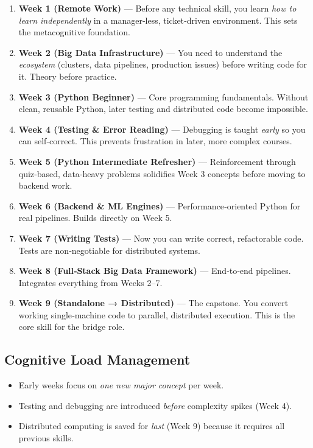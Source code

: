\documentclass[12pt]{article}
\begin{document}
	\begin{enumerate}
		\item \textbf{Week 1 (Remote Work)} — Before any technical skill, you learn \emph{how to learn independently} in a manager‑less, ticket‑driven environment. This sets the metacognitive foundation.
		
		\item \textbf{Week 2 (Big Data Infrastructure)} — You need to understand the \emph{ecosystem} (clusters, data pipelines, production issues) before writing code for it. Theory before practice.
		
		\item \textbf{Week 3 (Python Beginner)} — Core programming fundamentals. Without clean, reusable Python, later testing and distributed code become impossible.
		
		\item \textbf{Week 4 (Testing \& Error Reading)} — Debugging is taught \emph{early} so you can self‑correct. This prevents frustration in later, more complex courses.
		
		\item \textbf{Week 5 (Python Intermediate Refresher)} — Reinforcement through quiz‑based, data‑heavy problems solidifies Week 3 concepts before moving to backend work.
		
		\item \textbf{Week 6 (Backend \& ML Engines)} — Performance‑oriented Python for real pipelines. Builds directly on Week 5.
		
		\item \textbf{Week 7 (Writing Tests)} — Now you can write correct, refactorable code. Tests are non‑negotiable for distributed systems.
		
		\item \textbf{Week 8 (Full‑Stack Big Data Framework)} — End‑to‑end pipelines. Integrates everything from Weeks 2–7.
		
		\item \textbf{Week 9 (Standalone → Distributed)} — The capstone. You convert working single‑machine code to parallel, distributed execution. This is the core skill for the bridge role.
	\end{enumerate}
	
	\subsection*{Cognitive Load Management}
	\begin{itemize}
		\item Early weeks focus on \emph{one new major concept} per week.
		\item Testing and debugging are introduced \emph{before} complexity spikes (Week 4).
		\item Distributed computing is saved for \emph{last} (Week 9) because it requires all previous skills.
	\end{itemize}
	
\end{document}
